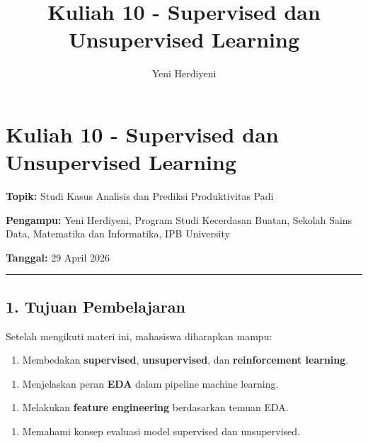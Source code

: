 \documentclass[12pt,a4paper]{article}
\begin{document}
\title{Kuliah 10 - Supervised dan Unsupervised Learning}
\author{Yeni Herdiyeni}
\date{}
\maketitle

\maketitle
\tableofcontents
\newpage

\section{Kuliah 10 - Supervised dan Unsupervised Learning}

\textbf{Topik:} Studi Kasus Analisis dan Prediksi Produktivitas Padi  

\textbf{Pengampu:} Yeni Herdiyeni, Program Studi Kecerdasan Buatan, Sekolah Sains Data, Matematika dan Informatika, IPB University  

\textbf{Tanggal:} 29 April 2026


\hrule


\subsection{1. Tujuan Pembelajaran}

Setelah mengikuti materi ini, mahasiswa diharapkan mampu:


\begin{enumerate}
\item Membedakan \textbf{supervised}, \textbf{unsupervised}, dan \textbf{reinforcement learning}.
\end{enumerate}

\begin{enumerate}
\item Menjelaskan peran \textbf{EDA} dalam pipeline machine learning.
\end{enumerate}

\begin{enumerate}
\item Melakukan \textbf{feature engineering} berdasarkan temuan EDA.
\end{enumerate}

\begin{enumerate}
\item Memahami konsep evaluasi model supervised dan unsupervised.
\end{enumerate}
\end{document}
